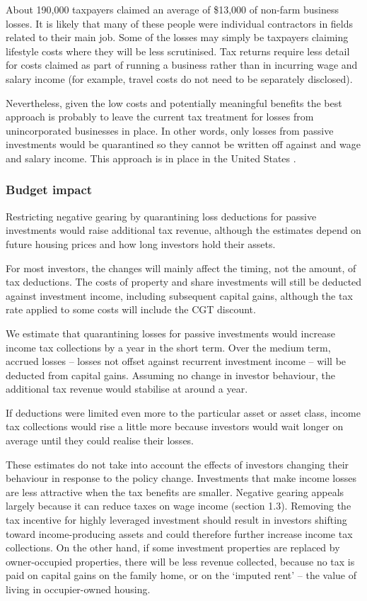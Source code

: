 \documentclass{grattan}\usepackage[]{graphicx}\usepackage[]{color}
\begin{document}
About 190,000 taxpayers claimed an average of \$13,000 of non-farm business losses. It is likely that many of these people were individual contractors in fields related to their main job. Some of the losses may simply be taxpayers claiming lifestyle costs where they will be less scrutinised. Tax returns require less detail for costs claimed as part of running a business rather than in incurring wage and salary income (for example, travel costs do not need to be separately disclosed). 



Nevertheless, given the low costs and potentially meaningful benefits the best approach is probably to leave the current tax treatment for losses from unincorporated businesses in place. In other words, only losses from passive investments would be quarantined so they cannot be written off against and wage and salary income. This approach is in place in the United States . 

\subsubsection{Budget impact}
Restricting negative gearing by quarantining loss deductions for passive investments would raise additional tax revenue, although the estimates depend on future housing prices and how long investors hold their assets. 

For most investors, the changes will mainly affect the timing, not the amount, of tax deductions. The costs of property and share investments will still be deducted against investment income, including subsequent capital gains, although the tax rate applied to some costs will include the CGT discount. 



We estimate that quarantining losses for passive investments would increase income tax collections by  a year in the short term. Over the medium term, accrued losses -- losses not offset against recurrent investment income -- will be deducted from capital gains. Assuming no change in investor behaviour, the additional tax revenue would stabilise at around  a year.

If deductions were limited even more to the particular asset or asset class, income tax collections would rise a little more because investors would wait longer on average until they could realise their losses. 

These estimates do not take into account the effects of investors changing their behaviour in response to the policy change. Investments that make income losses are less attractive when the tax benefits are smaller. Negative gearing appeals largely because it can reduce taxes on wage income (section 1.3). Removing the tax incentive for highly leveraged investment should result in investors shifting toward income-producing assets and could therefore further increase income tax collections. On the other hand, if some investment properties are replaced by owner-occupied properties, there will be less revenue collected, because no tax is paid on capital gains on the family home, or on the `imputed rent' -- the value of living in occupier-owned housing.
\end{document}
